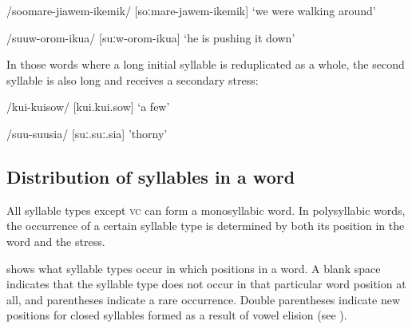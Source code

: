 /soomare-jiawem-ikemik/  [{{\textprimstress}soːmare-j}{\textsci}{{\textprimstress}}{{\textprimstress}}awem-i{{\textprimstress}}{{\textprimstress}}kemik]  `we were walking around'

/suuw-orom-ikua/  [{{\textprimstress}}suːw-o{{\textprimstress}}{{\textprimstress}}rom-i{{\textprimstress}}{{\textprimstress}}kua]  `he is pushing it down'

In those words where a long initial syllable is reduplicated as a whole, the second syllable is also long and receives a secondary stress:

/kui-kuisow/  [{{\textprimstress}}kui.{{\textprimstress}}{{\textprimstress}}kui.sow]  `a few'

/suu-suusia/  [{{\textprimstress}}suː.{{\textprimstress}}{{\textprimstress}}suː.sia]  'thorny'

\subsection{Distribution of syllables in a word}

All syllable types except  \textsc{vc} can form a monosyllabic word. In polysyllabic words, the occurrence of a certain syllable type is determined by both its position in the word and the stress. 

 shows what syllable types occur in which positions in a word.  A blank space indicates that the syllable type does not occur in that particular word position at all, and parentheses indicate a rare occurrence. Double parentheses indicate new positions for closed syllables formed as a result of vowel elision (see ). 



